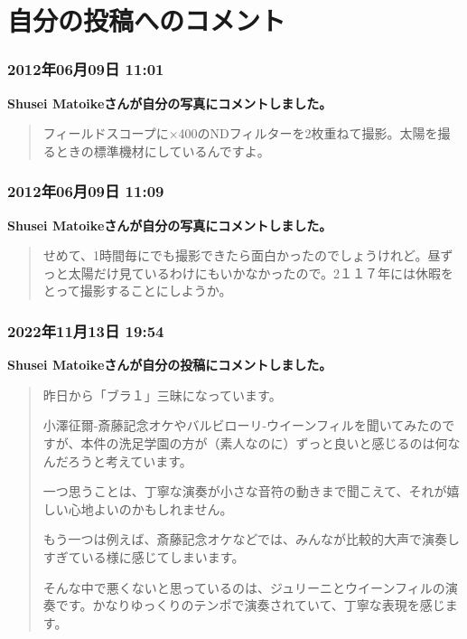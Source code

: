 \chapter{自分の投稿へのコメント}

\subsection*{2012年06月09日 11:01}

\textbf{Shusei Matoikeさんが自分の写真にコメントしました。}

\begin{quote}
フィールドスコープに×400のNDフィルターを2枚重ねて撮影。太陽を撮るときの標準機材にしているんですよ。
\end{quote}

\subsection*{2012年06月09日 11:09}

\textbf{Shusei Matoikeさんが自分の写真にコメントしました。}

\begin{quote}
せめて、1時間毎にでも撮影できたら面白かったのでしょうけれど。昼ずっと太陽だけ見ているわけにもいかなかったので。2１１７年には休暇をとって撮影することにしようか。
\end{quote}

\subsection*{2022年11月13日 19:54}

\textbf{Shusei Matoikeさんが自分の投稿にコメントしました。}

\begin{quote}
昨日から「ブラ１」三昧になっています。

小澤征爾-斎藤記念オケやバルビローリ-ウイーンフィルを聞いてみたのですが、本件の洗足学園の方が（素人なのに）ずっと良いと感じるのは何なんだろうと考えています。

一つ思うことは、丁寧な演奏が小さな音符の動きまで聞こえて、それが嬉しい心地よいのかもしれません。

もう一つは例えば、斎藤記念オケなどでは、みんなが比較的大声で演奏しすぎている様に感じてしまいます。

そんな中で悪くないと思っているのは、ジュリーニとウイーンフィルの演奏です。かなりゆっくりのテンポで演奏されていて、丁寧な表現を感じます。
\end{quote}

